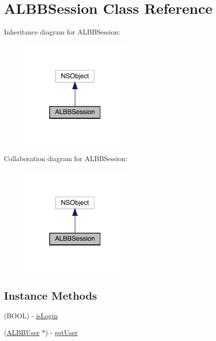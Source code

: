 \hypertarget{interface_a_l_b_b_session}{}\section{A\+L\+B\+B\+Session Class Reference}
\label{interface_a_l_b_b_session}


Inheritance diagram for A\+L\+B\+B\+Session\+:\nopagebreak
\begin{figure}[H]
\begin{center}
\leavevmode
\includegraphics[width=157pt]{interface_a_l_b_b_session__inherit__graph}
\end{center}
\end{figure}


Collaboration diagram for A\+L\+B\+B\+Session\+:\nopagebreak
\begin{figure}[H]
\begin{center}
\leavevmode
\includegraphics[width=157pt]{interface_a_l_b_b_session__coll__graph}
\end{center}
\end{figure}
\subsection*{Instance Methods}
\begin{DoxyCompactItemize}
\item 
(B\+O\+OL) -\/ \mbox{\hyperlink{interface_a_l_b_b_session_a501bd49a703cf9d0f41f9533ae661af3}{is\+Login}}
\item 
(\mbox{\hyperlink{interface_a_l_b_b_user}{A\+L\+B\+B\+User}} $\ast$) -\/ \mbox{\hyperlink{interface_a_l_b_b_session_a199837d5253b40e16e5d522cd779e2dd}{get\+User}}
\end{DoxyCompactItemize}
